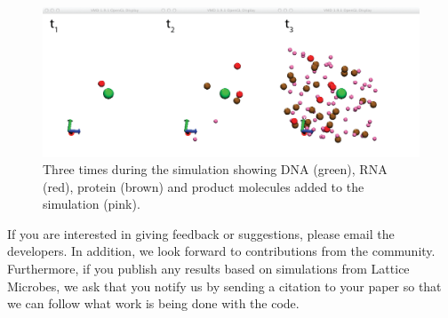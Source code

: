 \begin{figure}[h!]
  \centering
        \includegraphics[width=1.0\textwidth]{Figures/RDMECMETimetrace.png}
        \caption{Three times during the simulation showing DNA (green), RNA (red), protein (brown) and product molecules added to the simulation (pink).} \label{fig:rdmecmetimetrace}
\end{figure}

If you are interested in giving feedback or suggestions, please email the developers.  In addition, we look forward to contributions from the community.  Furthermore, if you publish any results based on simulations from Lattice Microbes, we ask that you notify us by sending a citation to your paper so that we can follow what work is being done with the code.  
